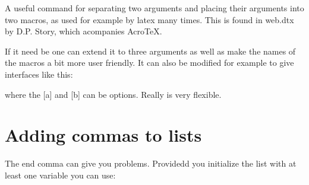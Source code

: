 A useful command for separating two arguments and placing their arguments into two macros, as used for example by latex many times. This is found in web.dtx by D.P. Story, which acompanies AcroTeX.

\begin{teXXX}

\def\getargs#1#2{%
  \def\aeb@argi{#1}
  \def\aeb@argii{#2}
}

\end{teXXX}

If it need be one can extend it to three arguments as well as make the names of the macros a bit more user friendly. It can also be modified for example to give interfaces like this:



\noindent where the [a] and [b] can be options. Really \tex is very flexible.


\section{Adding commas to lists}

The end comma can give you problems. Providedd you initialize the list with at least one variable you can use:

\begin{teX}
\newcommand\uselanguage[2][]{%
  \g@addto@macro\trans@languages{,#2}%
}
\end{teX}












